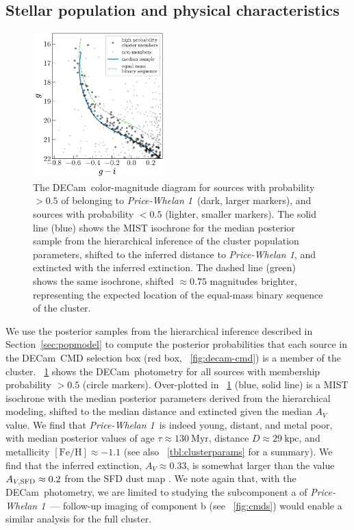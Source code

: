 \documentclass[twocolumn]{aastex62}
\newcommand{\acronym}[1]{{\small{#1}}}
\newcommand{\decam}{DECam}
\newcommand{\sectionname}{Section}
\newcommand{\feh}{\ensuremath{[\textrm{Fe} / \textrm{H}]}}
\newcommand{\clustername}{\textsl{Price-Whelan 1}}
\newcommand{\clage}{\ensuremath{130~\textrm{Myr}}}
\newcommand{\clfeh}{\ensuremath{-1.1}}
\newcommand{\cldist}{\ensuremath{29~\textrm{kpc}}}
\begin{document}
\subsection{Stellar population and physical characteristics}
\label{sec:popchars}

\begin{figure}[htb]
\centering
\includegraphics[width=0.45\textwidth]{figures/hierarch-results.pdf}
\caption{The \decam\ color-magnitude diagram for sources with probability $>0.5$ of belonging to \clustername\ (dark, larger markers), and sources with probability $<0.5$ (lighter, smaller markers).
The solid line (blue) shows the \acronym{MIST} isochrone for the median posterior sample from the hierarchical inference of the cluster population parameters, shifted to the inferred distance to \clustername, and extincted with the inferred extinction.
The dashed line (green) shows the same isochrone, shifted $\approx 0.75$ magnitudes brighter, representing the expected location of the equal-mass binary sequence of the cluster.
}
\label{fig:hierarch-iso}
\end{figure}

We use the posterior samples from the hierarchical inference described in \sectionname~\ref{sec:popmodel} to compute the posterior probabilities that each source in the \decam\ CMD selection box (red box, \figurename~\ref{fig:decam-cmd}) is a member of the cluster.
\figurename~\ref{fig:hierarch-iso} shows the \decam\ photometry for all sources with membership probability $> 0.5$ (circle markers).
Over-plotted in \figurename~\ref{fig:hierarch-iso} (blue, solid line) is a \acronym{MIST} isochrone with the median posterior parameters derived from the hierarchical modeling, shifted to the median distance and extincted given the median $A_V$ value.
We find that \clustername\ is indeed young, distant, and metal poor, with median posterior values of age $\tau \approx \clage$, distance $D \approx \cldist$, and metallicity $\feh \approx \clfeh$ (see also \tablename~\ref{tbl:clusterparams} for a summary).
We find that the inferred extinction, $A_V \approx 0.33$, is somewhat larger than the value $A_{V, {\rm SFD}} \approx 0.2$ from the SFD dust map \citep{Schlegel:1998}.
We note again that, with the \decam\ photometry, we are limited to studying the subcomponent a of \clustername\ --- follow-up imaging of component b (see \figurename~\ref{fig:cmds}) would enable a similar analysis for the full cluster.
\end{document}
